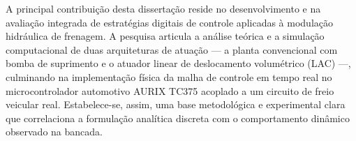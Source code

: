 A principal contribuição desta dissertação reside no desenvolvimento e na avaliação integrada de estratégias digitais de controle aplicadas à modulação hidráulica de frenagem. A pesquisa articula a análise teórica e a simulação computacional de duas arquiteturas de atuação — a planta convencional com bomba de suprimento e o atuador linear de deslocamento volumétrico (LAC) —, culminando na implementação física da malha de controle em tempo real no microcontrolador automotivo AURIX TC375 acoplado a um circuito de freio veicular real. Estabelece-se, assim, uma base metodológica e experimental clara que correlaciona a formulação analítica discreta com o comportamento dinâmico observado na bancada.